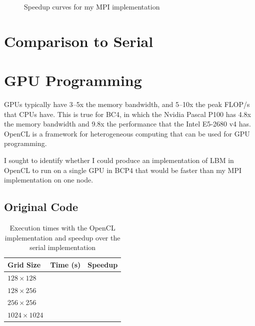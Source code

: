 \documentclass[twocolumn, a4paper]{article}
\begin{document}
\begin{figure}[htpb]
{
  }
  \caption{Speedup curves for my MPI implementation}\label{fig:scaling}
\end{figure}

\section{Comparison to Serial}

\section{GPU Programming}

GPUs typically have 3--5x the memory bandwidth, and 5--10x the peak FLOP/s that CPUs have.
This is true for BC4, in which the Nvidia Pascal P100 has 4.8x the memory bandwidth and 9.8x the performance that the Intel E5-2680 v4 has.
OpenCL is a framework for heterogeneous computing that can be used for GPU programming.

I sought to identify whether I could produce an implementation of LBM in OpenCL to run on a single GPU in BCP4 that would be faster than my MPI implementation on one node.

\subsection{Original Code}

\begin{table}[htbp]
  \begin{center}
  \caption{Execution times with the OpenCL implementation and speedup over the serial implementation}\label{tab:OpenCL_1}
  \begin{tabular}[t]{l | l l} 
      \hline\hline
      Grid Size&Time (s)&Speedup\\
      \hline
      $128 \times 128$&\texttt{}&\texttt{}\\
      $128 \times 256$&\texttt{}&\texttt{}\\
      $256 \times 256$&\texttt{}&\texttt{}\\
      $1024 \times 1024$&\texttt{}&\texttt{}\\
      \hline
    \end{tabular}
  \end{center}
\end{table}
\end{document}
